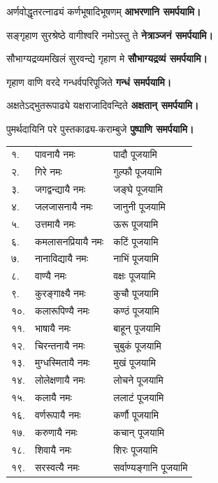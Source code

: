 \begin{center}
{अर्णवोद्धृतरत्नाढ्यं कर्णभूषादिभूषणम्}
\textbf{\devAya{} आभरणानि समर्पयामि।}
\medskip

{सङ्गृहाण सुरश्रेष्ठे वागीश्वरि नमोऽस्तु ते}
\textbf{\devAya{} नेत्राञ्जनं समर्पयामि।}
\footnotemark[\value{footnote}]
\medskip

{सौभाग्यद्रव्यमखिलं सुरवन्द्ये गृहाण मे}
\textbf{\devAya{} सौभाग्यद्रव्यं समर्पयामि।}
\medskip

{गृहाण वाणि वरदे गन्धर्वपरिपूजिते}
\textbf{\devAya{} गन्धं समर्पयामि।}
\medskip

{अक्षतेऽद्भुतरूपाढ्ये यक्षराजादिवन्दिते}
\textbf{\devAya{} अक्षतान् समर्पयामि।}
\medskip

{पुमर्थदायिनि परे पुस्तकाढ्य-कराम्बुजे}
\textbf{\devAya{} पुष्पाणि समर्पयामि।}
\end{center}

\begin{longtable}{ll@{— }l}
 १. & पावनायै नमः & पादौ पूजयामि\\
 २. & गिरे नमः & गुल्फौ पूजयामि\\
 ३. & जगद्वन्द्यायै नमः & जङ्घे पूजयामि\\
 ४. & जलजासनायै नमः & जानुनी पूजयामि\\
 ५. & उत्तमायै नमः & ऊरू पूजयामि\\
 ६. & कमलासनप्रियायै नमः & कटिं पूजयामि\\
 ७. & नानाविद्यायै नमः & नाभिं पूजयामि\\
 ८. & वाण्यै नमः & वक्षः पूजयामि\\
 ९. & कुरङ्गाक्ष्यै नमः & कुचौ पूजयामि\\
१०. & कलारूपिण्यै नमः & कण्ठं पूजयामि\\
११. & भाषायै नमः & बाहून् पूजयामि\\
१२. & चिरन्तनायै नमः & चुबुकं पूजयामि\\
१३. & मुग्धस्मितायै नमः & मुखं पूजयामि\\
१४. & लोलेक्षणायै नमः & लोचने पूजयामि\\
१५. & कलायै नमः & ललाटं पूजयामि\\
१६. & वर्णरूपायै नमः & कर्णौ पूजयामि\\
१७. & करुणायै नमः & कचान् पूजयामि\\
१८. & शिवायै नमः & शिरः पूजयामि\\
१९. & सरस्वत्यै नमः & सर्वाण्यङ्गानि पूजयामि\\
\end{longtable}

